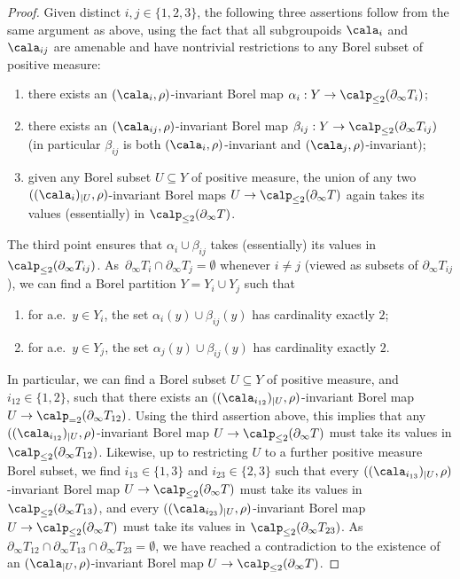 \begin{proof}
Given distinct $i,j\in\{1,2,3\}$, the following three assertions follow from the same argument as above, using the fact that all subgroupoids $\cala_i$ and $\cala_{ij}$ are amenable and have nontrivial restrictions to any Borel subset of positive measure:
\begin{enumerate}
\item there exists an $(\cala_i,\rho)$-invariant Borel map $\alpha_i:Y\to\calp_{\le 2}(\partial_\infty T_i)$;
\item there exists an $(\cala_{ij},\rho)$-invariant Borel map $\beta_{ij}:Y\to\calp_{\le 2}(\partial_\infty T_{ij})$ (in particular $\beta_{ij}$ is both $(\cala_i,\rho)$-invariant and $(\cala_j,\rho)$-invariant);
\item given any Borel subset $U\subseteq Y$ of positive measure, the union of any two $((\cala_i)_{|U},\rho)$-invariant Borel maps $U\to\calp_{\le 2}(\partial_\infty T)$ again takes its values (essentially) in $\calp_{\le 2}(\partial_\infty T)$.
\end{enumerate}
The third point ensures that $\alpha_i\cup\beta_{ij}$ takes (essentially) its values in $\calp_{\le 2}(\partial_\infty T_{ij})$. As~$\partial_\infty T_i\cap\partial_\infty T_j=\emptyset$ whenever $i\neq j$ (viewed as subsets of $\partial_\infty T_{ij}$), we can find a Borel partition $Y=Y_i\cup Y_j$ such that
\begin{enumerate}
\item for a.e.\ $y\in Y_i$, the set $\alpha_i(y)\cup\beta_{ij}(y)$ has cardinality exactly $2$;
\item for a.e.\ $y\in Y_j$, the set $\alpha_j(y)\cup\beta_{ij}(y)$ has cardinality exactly $2$.
\end{enumerate}
In particular, we can find a Borel subset $U\!\subseteq\! Y$ of positive measure, and $i_{12}\!\in\!\{1,2\}$, such that there exists an $((\cala_{i_{12}})_{|U},\rho)$-invariant Borel map $U\to\calp_{=2}(\partial_\infty T_{12})$. Using the third assertion above, this implies that any $((\cala_{i_{12}})_{|U},\rho)$-invariant Borel map $U\to\calp_{\le 2}(\partial_\infty T)$ must take its values in $\calp_{\le 2}(\partial_\infty T_{12})$. Likewise, up to restricting $U$ to a further positive measure Borel subset, we find $i_{13}\in\{1,3\}$ and $i_{23}\in\{2,3\}$ such that every $((\cala_{i_{13}})_{|U},\rho)$-invariant Borel map $U\to\calp_{\le 2}(\partial_\infty T)$ must take its values in $\calp_{\le 2}(\partial_\infty T_{13})$, and every $((\cala_{i_{23}})_{|U},\rho)$-invariant Borel map $U\to\calp_{\le 2}(\partial_\infty T)$ must take its values in $\calp_{\le 2}(\partial_\infty T_{23})$. As $\partial_\infty T_{12}\cap\partial_\infty T_{13}\cap\partial_\infty T_{23}=\emptyset$, we have reached a contradiction to the existence of an $(\cala_{|U},\rho)$-invariant Borel map $U\to\calp_{\le 2}(\partial_\infty T)$.
\end{proof}

